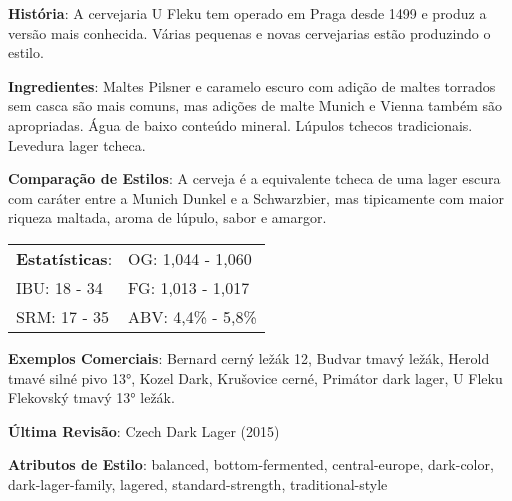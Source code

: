 \textbf{História}: A cervejaria U Fleku tem operado em Praga desde 1499 e produz a versão mais conhecida. Várias pequenas e novas cervejarias estão produzindo o estilo.

\textbf{Ingredientes}: Maltes Pilsner e caramelo escuro com adição de maltes torrados sem casca são mais comuns, mas adições de malte Munich e Vienna também são apropriadas. Água de baixo conteúdo mineral. Lúpulos tchecos tradicionais. Levedura lager tcheca.

\textbf{Comparação de Estilos}: A cerveja é a equivalente tcheca de uma lager escura com caráter entre a Munich Dunkel e a Schwarzbier, mas tipicamente com maior riqueza maltada, aroma de lúpulo, sabor e amargor.

\begin{tabular}{@{}p{35mm}p{35mm}@{}}
  \textbf{Estatísticas}: & OG: 1,044 - 1,060 \\
  IBU: 18 - 34  & FG: 1,013 - 1,017  \\
  SRM: 17 - 35   & ABV: 4,4\% - 5,8\%
\end{tabular}

\textbf{Exemplos Comerciais}: Bernard cerný ležák 12, Budvar tmavý ležák, Herold tmavé silné pivo 13°, Kozel Dark, Krušovice cerné, Primátor dark lager, U Fleku Flekovský tmavý 13° ležák.

\textbf{Última Revisão}: Czech Dark Lager (2015)

\textbf{Atributos de Estilo}: balanced, bottom-fermented, central-europe, dark-color, dark-lager-family, lagered, standard-strength, traditional-style